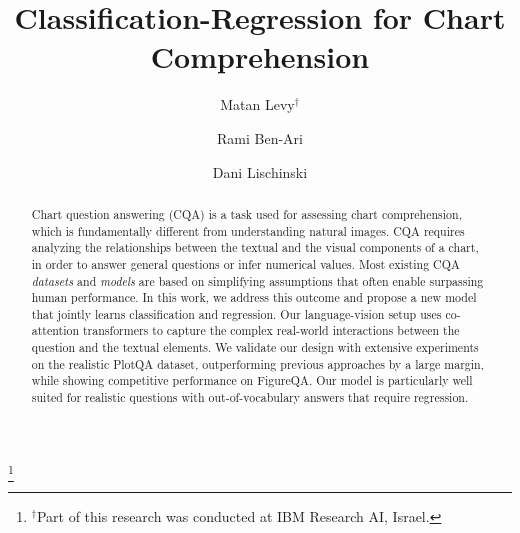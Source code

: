 \documentclass[runningheads]{llncs}
\newcommand\blfootnote[1]{\begingroup
  \renewcommand\thefootnote{}\footnote{#1}\addtocounter{footnote}{-1}\endgroup
}
\begin{document}
\pagestyle{headings}
\mainmatter
\def\ECCVSubNumber{5040}  

\title{Classification-Regression for Chart Comprehension} 

\begin{comment}
\titlerunning{ECCV-22 submission ID \ECCVSubNumber} 
\authorrunning{ECCV-22 submission ID \ECCVSubNumber} 
\author{Anonymous ECCV submission}
\institute{Paper ID \ECCVSubNumber}
\end{comment}


\author{Matan Levy$^\dagger$ \and
Rami Ben-Ari \and
Dani Lischinski}
\maketitle

\begin{abstract}
   Chart question answering (CQA) is a task used for assessing chart comprehension, which is fundamentally different from understanding natural images. CQA requires analyzing the relationships between the textual and the visual components of a chart, in order to answer general questions or infer numerical values. Most existing CQA {\it datasets} and {\it models} are based on simplifying assumptions that often enable surpassing human performance. In this work, we address this outcome and propose a new model that jointly learns classification and regression. Our language-vision setup uses co-attention transformers to capture the complex real-world interactions between the question and the textual elements. We validate our design with extensive experiments on the realistic PlotQA dataset, outperforming previous approaches by a large margin, while showing competitive performance on FigureQA. Our model is particularly well suited for realistic questions with out-of-vocabulary answers that require regression.
 \end{abstract}

\blfootnote{$^\dagger$Part of this research was conducted at IBM Research AI, Israel.}
\end{document}
